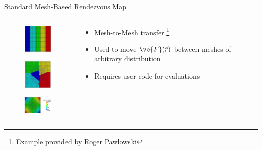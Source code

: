 \documentclass{beamer}
\begin{document}
\begin{frame}{Standard Mesh-Based Rendezvous Map}

  \begin{columns}
    
    \begin{column}{0.4\textwidth}
      \begin{figure}
      \centering
      \includegraphics[width=0.9in]{neutronics_parallel_decomp.png}
      \end{figure}

      \begin{figure}
      \centering
      \includegraphics[width=0.9in]{cfd_parallel_decomp.png}
      \end{figure}

      \begin{figure}
      \centering
      \includegraphics[width=0.9in]{cfd_transferred_field.png}
      \end{figure}
    \end{column}

    \begin{column}{0.6\textwidth}
      \begin{itemize}
      \item Mesh-to-Mesh transfer \footnote{Example provided by Roger
        Pawlowski}
        \medskip
      \item Used to move $\ve{F}(\hat{r})$ between meshes of arbitrary
        distribution
        \medskip
      \item Requires user code for evaluations
      \end{itemize}
    \end{column}

  \end{columns}

\end{frame}
\end{document}
